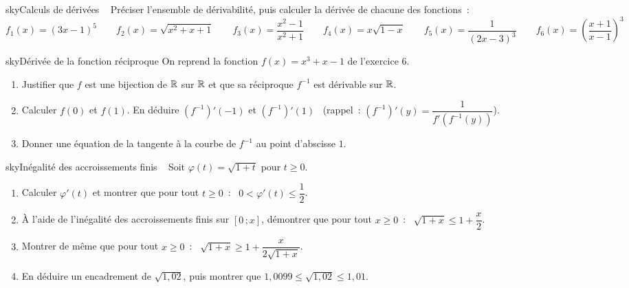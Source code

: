 \begin{exo}{sky}{Calculs de dérivées \ }
Préciser l'ensemble de dérivabilité, puis calculer la dérivée de chacune des fonctions~:
\[
f_1(x)=(3x-1)^5 \qquad f_2(x)=\sqrt{x^2+x+1} \qquad f_3(x)=\frac{x^2-1}{x^2+1} \qquad f_4(x)=x\sqrt{1-x} \qquad f_5(x)=\frac{1}{(2x-3)^3} \qquad f_6(x)=\left(\frac{x+1}{x-1}\right)^3
\]
\end{exo}

\begin{exo}{sky}{Dérivée de la fonction réciproque }
On reprend la fonction $f(x)=x^3+x-1$ de l'exercice 6.
\begin{enumerate}
  \item Justifier que $f$ est une bijection de $\mathbb{R}$ sur $\mathbb{R}$ et que sa réciproque $f^{-1}$ est dérivable sur $\mathbb{R}$.
  \item Calculer $f(0)$ et $f(1)$. En déduire $\left(f^{-1}\right)'(-1)$ et $\left(f^{-1}\right)'(1)$ \ (rappel~: $\left(f^{-1}\right)'(y)=\dfrac{1}{f'\!\left(f^{-1}(y)\right)}$).
  \item Donner une équation de la tangente à la courbe de $f^{-1}$ au point d'abscisse $1$.
\end{enumerate}
\end{exo}

\begin{exo}{sky}{Inégalité des accroissements finis \demo\ }
Soit $\varphi(t)=\sqrt{1+t}$ pour $t\geq0$.
\begin{enumerate}
  \item Calculer $\varphi'(t)$ et montrer que pour tout $t\geq0$~: \ $0<\varphi'(t)\leq\dfrac12$.
  \item À l'aide de l'inégalité des accroissements finis sur $[0\,;x]$, démontrer que pour tout $x\geq0$~: \ $\sqrt{1+x}\leq1+\dfrac x2$.
  \item Montrer de même que pour tout $x\geq0$~: \ $\sqrt{1+x}\geq1+\dfrac{x}{2\sqrt{1+x}}$.
  \item En déduire un encadrement de $\sqrt{1{,}02}$, puis montrer que $1{,}0099\leq\sqrt{1{,}02}\leq1{,}01$.
\end{enumerate}
\end{exo}



